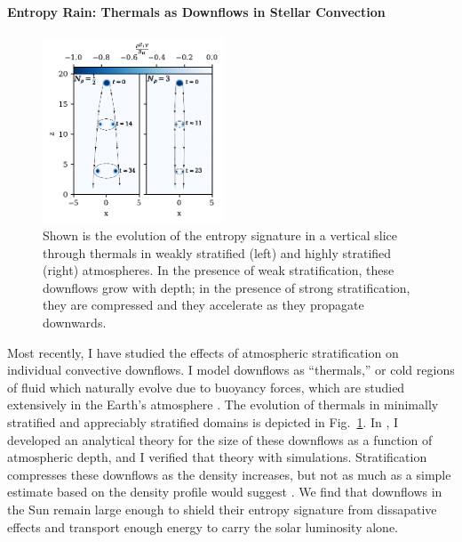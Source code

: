 \documentclass[preprint, hmargin=1in, vmargin=1in]{aastex62}
\begin{document}
\vspace{-4pt}
\paragraph{Entropy Rain: Thermals as Downflows in Stellar Convection}
\begin{figure}
	\begin{center}
	\vspace{-33pt}
    \includegraphics[width=0.48\textwidth]{./figs/evolution_colormeshes.pdf}
	\vspace{-16pt}
	\end{center}
    \caption{
	\citep[Fig.~2 of][]{andersLB2019} Shown is the evolution of the entropy signature in a vertical slice through thermals in weakly stratified (left) and highly stratified (right) atmospheres.
	In the presence of weak stratification, these downflows grow with depth; in the presence of strong stratification, they are compressed and they accelerate as they propagate downwards.
	\label{fig:thermals} }
	\vspace{-22pt}
\end{figure}
Most recently, I have studied the effects of atmospheric stratification on individual convective downflows.
I model downflows as ``thermals,'' or cold regions of fluid which naturally evolve due to buoyancy forces, which are studied extensively in the Earth's atmosphere \citep{lecoanet&jeevanjee2019}.
The evolution of thermals in minimally stratified and appreciably stratified domains is depicted in Fig.~\ref{fig:thermals}.
In \citet{andersLB2019}, I developed an analytical theory for the size of these downflows as a function of atmospheric depth, and I verified that theory with simulations. 
Stratification compresses these downflows as the density increases, but not as much as a simple estimate based on the density profile would suggest \citep[as in][]{brandenburg2016}.
We find that downflows in the Sun remain large enough to shield their entropy signature from dissapative effects and transport enough energy to carry the solar luminosity alone.
\end{document}
